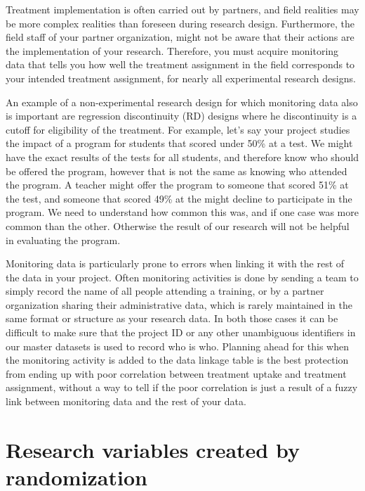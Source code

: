 Treatment implementation is often carried out by partners,
and field realities may be more complex realities than foreseen during research design.
Furthermore, the field staff of your partner organization,
might not be aware that their actions are the implementation of your research.
Therefore, you must acquire monitoring data that 
tells you how well the treatment assignment in the field
corresponds to your intended treatment assignment,
for nearly all experimental research designs.

An example of a non-experimental research design
for which monitoring data also is important
are regression discontinuity (RD) designs
where he discontinuity is 
a cutoff for eligibility of the treatment. 
For example, 
let's say your project studies the impact of a program
for students that scored under 50\% at a test.
We might have the exact results of the tests for all students, 
and therefore know who should be offered the program, 
however that is not the same as knowing who attended the program. 
A teacher might offer the program to someone that scored 51\% at the test,
and someone that scored 49\% at the might decline to participate in the program.
We need to understand how common this was, 
and if one case was more common than the other.
Otherwise the result of our research will not be helpful
in evaluating the program.

Monitoring data is particularly prone to errors 
when linking it with the rest of the data in your project.
Often monitoring activities is done by 
sending a team to simply record the name of all people attending a training,
or by a partner organization sharing their administrative data,
which is rarely maintained in the same format or structure as your research data.
In both those cases it can be difficult to make sure that
the project ID or any other unambiguous identifiers in our master datasets
is used to record who is who.
Planning ahead for this when the monitoring activity is added to the data linkage table
is the best protection from ending up with poor correlation 
between treatment uptake and treatment assignment,
without a way to tell if the poor correlation is just
a result of a fuzzy link between monitoring data and the rest of your data.


\section{Research variables created by randomization}

